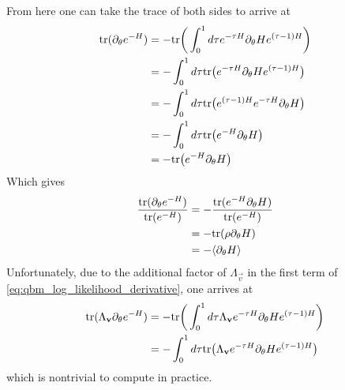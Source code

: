 From here one can take the trace of both sides to arrive at
\begin{align}
\begin{split}
    \text{tr}(\partial_\theta e^{-H})
        &= -\text{tr}\bigg( \int_{0}^{1} d\tau e^{-\tau H} \partial_\theta H e^{(\tau-1)H} \bigg) \\
        &= -\int_{0}^{1} d\tau \text{tr}\big(e^{-\tau H} \partial_\theta H e^{(\tau-1)H} \big) \\
        &= -\int_{0}^{1} d\tau \text{tr}\big(e^{(\tau-1)H} e^{-\tau H} \partial_\theta H \big) \\
        &= -\int_{0}^{1} d\tau \text{tr}\big(e^{-H} \partial_\theta H \big) \\
        &= -\text{tr}\big(e^{-H} \partial_\theta H \big)
\end{split}
\end{align}
Which gives
\begin{align}
\begin{split}
    \frac{\text{tr}(\partial_\theta e^{-H})}{\text{tr}(e^{-H})}
        &= -\frac{\text{tr}(e^{-H} \partial_\theta H)}{\text{tr}(e^{-H})} \\
        &= -\text{tr}(\rho \partial_\theta H) \\
        &= -\langle \partial_\theta H \rangle
\end{split}
\end{align}
Unfortunately, due to the additional factor of \( \Lambda_\vec{v} \) in the first term of \cref{eq:qbm_log_likelihood_derivative}, one arrives at
\begin{align}
\begin{split}
    \text{tr}(\Lambda_{\mathbf{v}} \partial_\theta e^{-H})
        &= -\text{tr}\bigg( \int_{0}^{1} d\tau \Lambda_{\mathbf{v}} e^{-\tau H} \partial_\theta H e^{(\tau-1)H} \bigg) \\
        &= -\int_{0}^{1} d\tau \text{tr}\big(\Lambda_{\mathbf{v}} e^{-\tau H} \partial_\theta H e^{(\tau-1)H} \big)
\end{split}
\end{align}
which is nontrivial to compute in practice.

